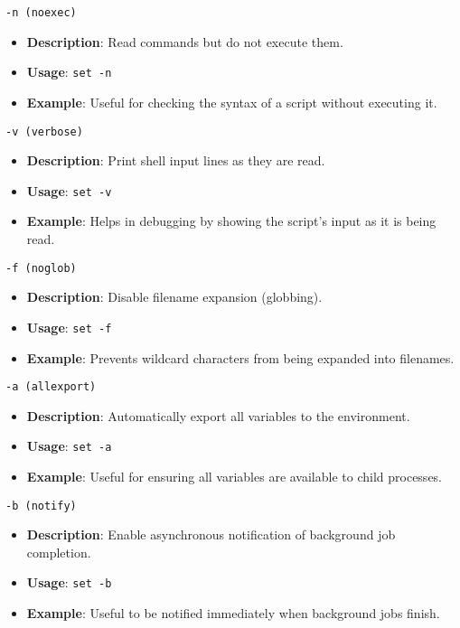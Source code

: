 \documentclass{report}
\begin{document}
\item \texttt{-n (noexec)}
    \begin{itemize}
        \item \textbf{Description}: Read commands but do not execute them.
        \item \textbf{Usage}: \texttt{set -n}
        \item \textbf{Example}: Useful for checking the syntax of a script without executing it.
    \end{itemize}

\item \texttt{-v (verbose)}
    \begin{itemize}
        \item \textbf{Description}: Print shell input lines as they are read.
        \item \textbf{Usage}: \texttt{set -v}
        \item \textbf{Example}: Helps in debugging by showing the script’s input as it is being read.
    \end{itemize}

\item \texttt{-f (noglob)}
    \begin{itemize}
        \item \textbf{Description}: Disable filename expansion (globbing).
        \item \textbf{Usage}: \texttt{set -f}
        \item \textbf{Example}: Prevents wildcard characters from being expanded into filenames.
    \end{itemize}

\item \texttt{-a (allexport)}
    \begin{itemize}
        \item \textbf{Description}: Automatically export all variables to the environment.
        \item \textbf{Usage}: \texttt{set -a}
        \item \textbf{Example}: Useful for ensuring all variables are available to child processes.
    \end{itemize}

\item \texttt{-b (notify)}
    \begin{itemize}
        \item \textbf{Description}: Enable asynchronous notification of background job completion.
        \item \textbf{Usage}: \texttt{set -b}
        \item \textbf{Example}: Useful to be notified immediately when background jobs finish.
    \end{itemize}
\end{document}
